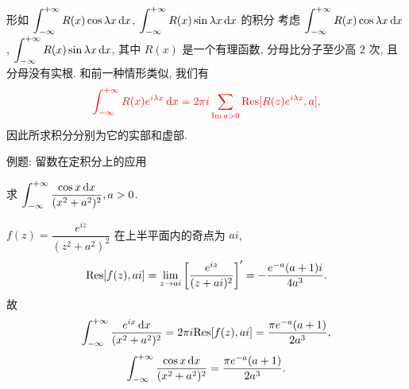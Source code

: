 \begin{frame}{形如 $\displaystyle\int_{-\infty}^{+\infty}R(x)\cos{\lambda x}\,\mathrm{d} x$,
$\displaystyle\int_{-\infty}^{+\infty}R(x)\sin{\lambda x}\,\mathrm{d} x$ 的积分}
\onslide<+->
考虑 $\displaystyle\int_{-\infty}^{+\infty}R(x)\cos{\lambda x}\,\mathrm{d} x$,
$\displaystyle\int_{-\infty}^{+\infty}R(x)\sin{\lambda x}\,\mathrm{d} x$, 其中 $R(x)$ 是一个有理函数, 分母比分子至少高 $2$ 次, 且分母没有实根.
\onslide<+->
和前一种情形类似, 我们有
\[{\color{red}{\int_{-\infty}^{+\infty}R(x)e^{i\lambda x}\,\mathrm{d}x
=2\pi i\sum_{\operatorname{Im}a>0}{\mathrm{Res}}[R(z)e^{i\lambda z},a],}}\]
\onslide<+->
因此所求积分分别为它的实部和虚部.
\end{frame}


\begin{frame}{例题: 留数在定积分上的应用}
\beqskip{2pt}
\begin{example}
求 $\displaystyle\int_{-\infty}^{+\infty}\frac{\cos x\,\mathrm{d} x}{(x^2+a^2)^2}, a>0$.
\end{example}
\begin{solution}
$f(z)=\dfrac{e^{iz}}{(z^2+a^2)^2}$ 在上半平面内的奇点为 $ai$,
\onslide<+->
\[{\mathrm{Res}}[f(z),ai]=\lim_{z\to ai}\left[\frac{e^{iz}}{(z+ai)^2}\right]'=-\frac{e^{-a}(a+1)i}{4a^3}.\]
\onslide<+->
故
\[\int_{-\infty}^{+\infty}\frac{e^{ix}\,\mathrm{d} x}{(x^2+a^2)^2}=2\pi i {\mathrm{Res}}[f(z),ai]=\frac{\pi e^{-a}(a+1)}{2a^3},\]
\onslide<+->
\[\int_{-\infty}^{+\infty}\frac{\cos x\,\mathrm{d} x}{(x^2+a^2)^2}=\frac{\pi e^{-a}(a+1)}{2a^3}.\]
\end{solution}
\endgroup
\end{frame}

